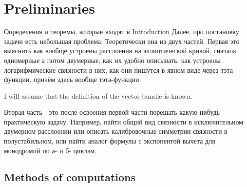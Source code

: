 \documentclass[../main.tex]{subfiles}
\begin{document}



    \section*{Preliminaries} \label{sec:prelim}
       Определения и теоремы, которые входят в Introduction
        Далее, про постановку задачи есть небольшая проблема. 
        Теоретически она из двух частей.
        Первая это выяснить как вообще устроены расслоения на эллиптической кривой, сначала одномерные а потом двумерные, как их удобно описывать, как устроены логарифмические связности в них, как они пишутся в явном виде через тэта-функции, причём здесь вообще тэта-функции.
        
        I will assume that the definition of the vector bundle is known.
        
        
        Вторая часть - это после освоения первой части порешать какую-нибудь практическую задачу. Например, найти общий вид связности в исключительном двумерном расслоении или описать калибровочные симметрии связности в полустабильном, или найти аналог формулы с экспонентой вычета для монодромий по а- и б- циклам.


    \subsection*{Methods of computations}\label{subsec:методы-явных-вычислений}
\end{document}
